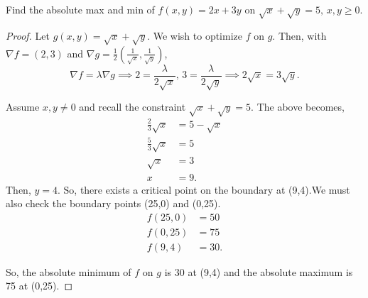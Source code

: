 \documentclass[../hw5]{subfiles}
\begin{document}
\begin{problem}[3]
Find the absolute max and min of $f(x,y)=2x + 3y$ on $\sqrt{x} + \sqrt{y}=5,\, x,y\ge 0$.
\end{problem}
\begin{proof}
	Let $g(x,y)=\sqrt{x} + \sqrt{y}$.
	We wish to optimize $f$ on  $g$.
	Then, with  $\nabla f = (2,3)$ and $\nabla g = \frac{1}{2}(\frac{1}{\sqrt{x}},\frac{1}{\sqrt{y}})$, \[
		\nabla f = \lambda \nabla g \implies 2 = \frac{\lambda}{2\sqrt{x}},\, 3 = \frac{\lambda}{2\sqrt{y}} \implies 2\sqrt{x}=3\sqrt{y}
		.\]

	Assume $x,y \neq 0$ and recall the constraint $\sqrt{x} + \sqrt{y}=5$. The above becomes,
	\begin{align*}
		\frac{2}{3}\sqrt{x} & = 5-\sqrt{x} \\
		\frac{5}{3}\sqrt{x} & = 5          \\
		\sqrt{x}            & = 3          \\
		x                   & = 9
		.\end{align*} Then, $y=4$. So, there exists a critical point on the boundary at (9,4).We must also check the boundary points (25,0) and (0,25).
	\begin{align*}
		f(25,0) & = 50 \\
		f(0,25) & = 75 \\
		f(9,4)  & = 30
		.\end{align*}

	So, the absolute minimum of $f$ on  $g$ is 30 at (9,4) and the absolute maximum is 75 at (0,25).
\end{proof}
\end{document}
